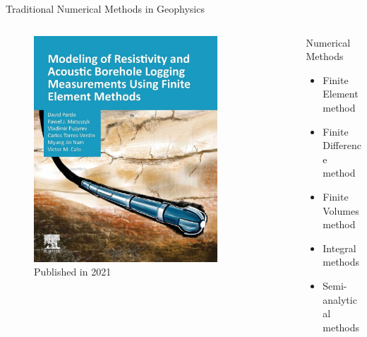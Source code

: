\begin{frame}{Traditional Numerical Methods in Geophysics}
  \begin{columns}[T,onlytextwidth]
    \begin{column}{0.48\textwidth}
      \begin{figure}
	\centering %
      \includegraphics[width=0.8\textwidth]{Diapos/Intro/Figures/PardoBook.jpg} %
	\caption{Published in 2021} %
	\label{fig:book} %
	\end{figure}
    \end{column}
    \begin{column}{0.48\textwidth}
      \begin{block}{Numerical Methods}
        \begin{itemize}
          \setlength\itemsep{2.4em} %
          \item Finite Element method
          \item Finite Difference method
          \item Finite Volumes method
          \item Integral methods
          \item Semi-analytical methods
        \end{itemize}
      \end{block}
    \end{column}
  \end{columns}
\end{frame}
